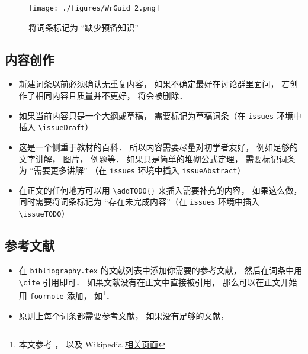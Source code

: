 \begin{figure}[ht]
\centering
\texttt{[image: ./figures/WrGuid\_2.png]}
\caption{将词条标记为 “缺少预备知识”} \label{WrGuid_fig2}
\end{figure}

\subsection{内容创作}
\begin{itemize}
\item 新建词条以前必须确认无重复内容， 如果不确定最好在讨论群里面问， 若创作了相同内容且质量并不更好， 将会被删除．
\item 如果当前内容只是一个大纲或草稿， 需要标记为草稿词条（在 \verb|issues| 环境中插入 \verb|\issueDraft|）
\item 这是一个侧重于教材的百科． 所以内容需要尽量对初学者友好， 例如足够的文字讲解， 图片， 例题等． 如果只是简单的堆砌公式定理， 需要标记词条为 “需要更多讲解” （在 \verb|issues| 环境中插入 \verb|issueAbstract|）
\item 在正文的任何地方可以用 \verb|\addTODO{}| 来插入需要补充的内容， 如果这么做， 同时需要将词条标记为 “存在未完成内容”（在 \verb|issues| 环境中插入 \verb|\issueTODO|）
\end{itemize}

\subsection{参考文献}
\begin{itemize}
\item 在 \verb|bibliography.tex| 的文献列表中添加你需要的参考文献， 然后在词条中用 \verb|\cite| 引用即可． 如果文献没有在正文中直接被引用， 那么可以在正文开始用 \verb|foornote| 添加， 如\footnote{本文参考 \cite{GriffE}， \cite{GriffQ} 以及 Wikipedia \href{https://www.wikipedia.org/}{相关页面}}．
\item 原则上每个词条都需要参考文献， 如果没有足够的文献， 
\end{itemize}
